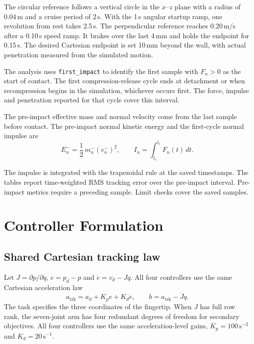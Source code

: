 \documentclass[12pt,a4paper]{article}
\newcommand{\ms}{m_n^-}
\newcommand{\vs}{v_n^-}
\begin{document}
The circular reference follows a vertical circle in the $x$--$z$ plane with a radius of
0.04\,m and a cruise period of 2\,s. With the 1\,s angular startup ramp, one
revolution from rest takes 2.5\,s. The perpendicular reference reaches
0.20\,m/s after a 0.10\,s speed ramp. It brakes over the last 4\,mm and holds the
endpoint for 0.15\,s. The desired Cartesian endpoint is set 10\,mm beyond the wall,
with actual penetration measured from the simulated motion.

The analysis uses \texttt{first\_impact} to identify the first sample with $F_n > 0$
as the start of contact. The first compression-release cycle ends at detachment or
when recompression begins in the simulation, whichever occurs first. The force,
impulse and penetration reported for that cycle cover this interval.

The pre-impact effective mass and normal velocity come from the last sample before
contact. The pre-impact normal kinetic energy and the first-cycle normal impulse are
\begin{equation}
  E_n^- = \frac{1}{2}\, \ms \left(\vs\right)^2, \qquad
  I_n = \int_{t_c}^{t_e} F_n(t)\, dt .
\end{equation}

The impulse is integrated with the trapezoidal rule at the saved timestamps.
The tables report time-weighted RMS tracking error over the pre-impact interval.
Pre-impact metrics require a preceding sample. Limit checks cover the saved samples.

\section{Controller Formulation}

\subsection{Shared Cartesian tracking law}
Let $J = \partial p/\partial q$, $e = p_d - p$ and $\dot e = v_d - J\dot q$. All four
controllers use the same Cartesian acceleration law
\begin{equation}
  a_{\mathrm{trk}} = a_d + K_p e + K_d \dot e, \qquad
  b = a_{\mathrm{trk}} - \dot J \dot q .
\end{equation}
The task specifies the three coordinates of the fingertip. When $J$ has full row
rank, the seven-joint arm has four redundant degrees of freedom for secondary
objectives. All four controllers use the same acceleration-level gains,
$K_p=100\,\mathrm{s}^{-2}$ and $K_d=20\,\mathrm{s}^{-1}$.
\end{document}
